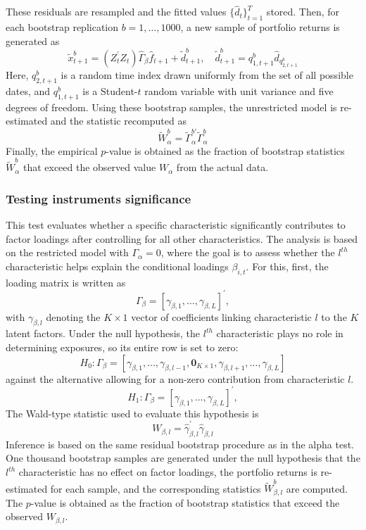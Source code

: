 \documentclass[
  12pt,
  a4paper,
  openany]{scrbook}
\begin{document}
These residuals are resampled and the fitted values
\({\{\hat d_t}\}_{t=1}^T\) stored. Then, for each bootstrap replication
\(b=1, \dots, 1000\), a new sample of portfolio returns is generated as
\[
\tilde x_{t+1}^b = (Z_t^\prime Z_t)\hat \Gamma_\beta \hat{f}_{t+1} + \tilde d^b_{t+1}, \quad
\tilde d^b_{t+1} = q_{1,t+1}^b \hat{d}_{q^b_{2,t+1}}
\] Here, \(q_{2,t+1}^b\) is a random time index drawn uniformly from the
set of all possible dates, and \(q_{1,t+1}^b\) is a Student-\(t\) random
variable with unit variance and five degrees of freedom. Using these
bootstrap samples, the unrestricted model is re-estimated and the
statistic recomputed as \[
\tilde{W}^b_\alpha = \tilde\Gamma^{b\prime}_\alpha\tilde\Gamma^b_\alpha
\] Finally, the empirical \(p\)-value is obtained as the fraction of
bootstrap statistics \(\tilde W_\alpha^b\) that exceed the observed
value \(W_\alpha\) from the actual data.

\subsubsection{Testing instruments
significance}\label{testing-instruments-significance}

This test evaluates whether a specific characteristic significantly
contributes to factor loadings after controlling for all other
characteristics. The analysis is based on the restricted model with
\(\Gamma_\alpha = 0\), where the goal is to assess whether the
\(l^{th}\) characteristic helps explain the conditional loadings
\(\beta_{i,t}\). For this, first, the loading matrix is written as \[
\Gamma_\beta = [\gamma_{\beta, 1}, \dots,\gamma_{\beta,L}]^\prime,
\] with \(\gamma_{\beta,l}\) denoting the \(K \times 1\) vector of
coefficients linking characteristic \(l\) to the \(K\) latent factors.
Under the null hypothesis, the \(l^{th}\) characteristic plays no role
in determining exposures, so its entire row is set to zero: \[
H_0 : \Gamma_\beta = [\gamma_{\beta, 1}, \dots, \gamma_{\beta, l-1}, \mathbf{0}_{K \times 1}, \gamma_{\beta, l+1}, \dots, \gamma_{\beta, L}]
\] against the alternative allowing for a non-zero contribution from
characteristic \(l\). \[
H_1 : \Gamma_\beta = [\gamma_{\beta, 1}, \dots,\gamma_{\beta,L}]^\prime,
\] The Wald-type statistic used to evaluate this hypothesis is \[
W_{\beta,l} = \hat\gamma^\prime_{\beta,l}\hat\gamma_{\beta,l}
\] Inference is based on the same residual bootstrap procedure as in the
alpha test. One thousand bootstrap samples are generated under the null
hypothesis that the \(l^{th}\) characteristic has no effect on factor
loadings, the portfolio returns is re-estimated for each sample, and the
corresponding statistics \(\tilde W_{\beta,l}^b\) are computed. The
\(p\)-value is obtained as the fraction of bootstrap statistics that
exceed the observed \(W_{\beta,l}\).
\end{document}
